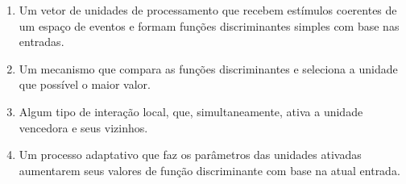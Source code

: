 \begin{enumerate}
\item Um vetor de unidades de processamento que recebem estímulos coerentes de um espaço de eventos e formam funções discriminantes simples com base nas entradas.
\item Um mecanismo que compara as funções discriminantes e seleciona a unidade que possível o maior valor.
\item Algum tipo de interação local, que, simultaneamente, ativa a unidade vencedora e seus vizinhos.
\item Um processo adaptativo que faz os parâmetros das unidades ativadas aumentarem seus valores de função discriminante com base na atual entrada.
\end{enumerate}









